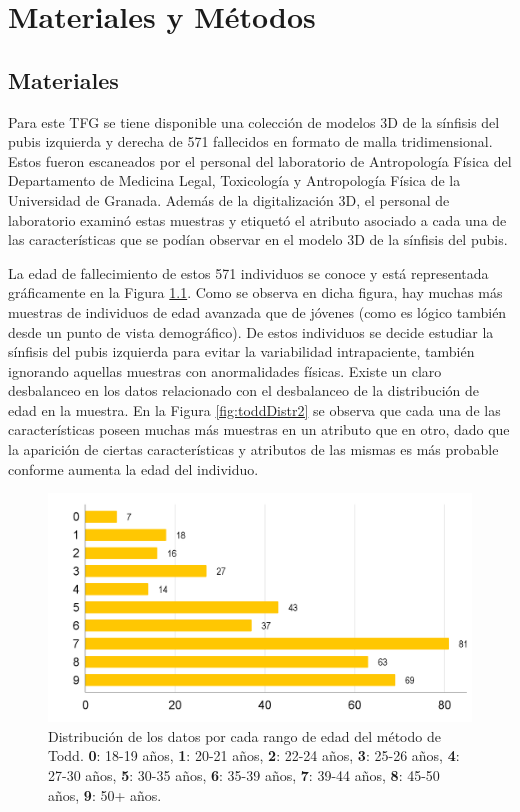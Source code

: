 \chapter{Materiales y Métodos}

\section{Materiales}
Para este TFG se tiene disponible una colección de modelos 3D de la sínfisis del pubis izquierda y derecha de 571 fallecidos en formato de malla tridimensional. Estos fueron escaneados por el personal del laboratorio de Antropología Física del Departamento de Medicina Legal, Toxicología y Antropología Física de la Universidad de Granada. Además de la digitalización 3D, el personal de laboratorio examinó estas muestras y etiquetó el atributo asociado a cada una de las características que se podían observar en el modelo 3D de la sínfisis del pubis. 

La edad de fallecimiento de estos 571 individuos se conoce y está representada gráficamente en la Figura \ref{fig:distrEdad}. Como se observa en dicha figura, hay muchas más muestras de individuos de edad avanzada que de jóvenes (como es lógico también desde un punto de vista demográfico). De estos individuos se decide estudiar la sínfisis del pubis izquierda para evitar la variabilidad intrapaciente, también ignorando aquellas muestras con anormalidades físicas. Existe un claro desbalanceo en los datos relacionado con el desbalanceo de la distribución de edad en la muestra. En la Figura \ref{fig:toddDistr2} se observa que cada una de las características poseen muchas más muestras en un atributo que en otro, dado que la aparición de ciertas características y atributos de las mismas es más probable conforme aumenta la edad del individuo.

\begin{figure}[h]
    \centering
    \includegraphics[width=0.9\linewidth]{imagenes/methods/0_distriEdad.png}
    \caption[Distribución de los datos por cada rango de edad]{Distribución de los datos por cada rango de edad del método de Todd. \textbf{0}: 18-19 años, \textbf{1}: 20-21 años, \textbf{2}: 22-24 años, \textbf{3}: 25-26 años, \textbf{4}: 27-30 años, \textbf{5}: 30-35 años, \textbf{6}: 35-39 años, \textbf{7}: 39-44 años, \textbf{8}: 45-50 años, \textbf{9}: 50+ años.}
    \label{fig:distrEdad}
\end{figure}

